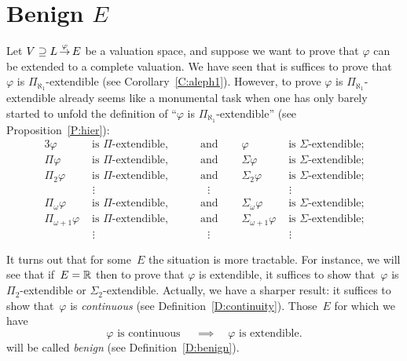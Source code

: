 \documentclass[main.tex]{subfiles}
\begin{document}
\section{Benign $E$}
Let 
$V \supseteq L\,\smash{\stackrel{\varphi}{\rightarrow}}\,E$
be a valuation space,
and suppose we want to prove
that $\varphi$ can be extended to a complete valuation.
We have seen
that is suffices to prove that~$\varphi$
is $\Pi_{\aleph_1}$-extendible
(see Corollary~\ref{C:aleph1}).
However,
to prove $\varphi$ is $\Pi_{\aleph_1}$-extendible
already
seems like a monumental task
when one has only barely started
to unfold
the definition of ``$\varphi$ is $\Pi_{\aleph_1}$-extendible''
(see Proposition~\ref{P:hier}):
\begin{alignat*}{3}
\varphi &\text{ is $\Pi$-extendible,}&
\quad&\text{ and }\quad& \varphi &\text{ is $\Sigma$-extendible;}\\
\Pi\varphi &\text{ is $\Pi$-extendible,}&
\quad&\text{ and }\quad& \Sigma\varphi &\text{ is $\Sigma$-extendible;}\\
\Pi_2\varphi &\text{ is $\Pi$-extendible,}&
\quad&\text{ and }\quad& \Sigma_2\varphi &\text{ is $\Sigma$-extendible;}\\
&\ \,\vdots&&\quad\vdots&&\ \,\vdots\\
\Pi_\omega\varphi &\text{ is $\Pi$-extendible,}&
\quad&\text{ and }\quad& \Sigma_\omega\varphi &\text{ is $\Sigma$-extendible;}\\
\Pi_{\omega+1}\varphi &\text{ is $\Pi$-extendible,}&
\quad&\text{ and }\quad& \Sigma_{\omega+1}\varphi
    &\text{ is $\Sigma$-extendible;}\\
&\ \,\vdots&&\quad\vdots&&\ \,\vdots
\end{alignat*}

It turns out
that for some~$E$
the situation is more tractable.
For instance,
we will see that if~$E=\mathbb{R}$
then to prove that $\varphi$ is extendible,
it suffices to show that~$\varphi$ is $\Pi_2$-extendible
or $\Sigma_2$-extendible.
Actually,
we have a sharper result:
it suffices to show that~$\varphi$ is \emph{continuous}
(see Definition~\ref{D:continuity}).
Those~$E$ for which we have 
\begin{equation*}
\varphi \text{ is continuous }
\quad\implies\quad
\varphi \text{ is extendible.}
\end{equation*}
will be called \emph{benign} (see Definition~\ref{D:benign}).
%
%
\end{document}
